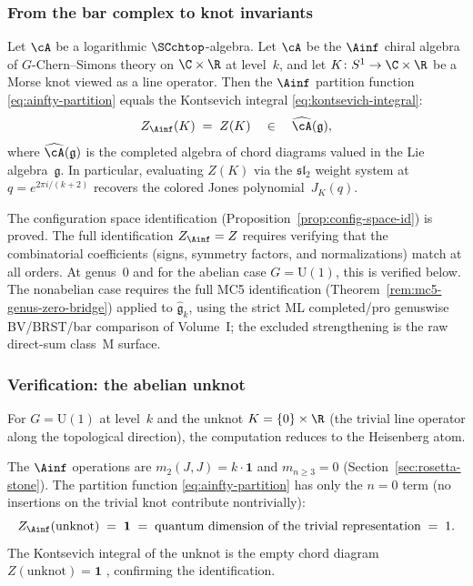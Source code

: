 \subsubsection{From the bar complex to knot invariants}

\begin{conjecture}
\label{conj:bar-kontsevich}
Let\/ $\cA$ be a logarithmic\/ $\SCchtop$-algebra. Let $\cA$ be the $\Ainf$ chiral
algebra of $G$-Chern--Simons theory on $\C \times \R$ at
level~$k$, and let $K \colon S^1 \to \C \times \R$ be a Morse
knot viewed as a line operator. Then the $\Ainf$ partition
function \eqref{eq:ainfty-partition} equals the Kontsevich
integral \eqref{eq:kontsevich-integral}:
\[
Z_{\Ainf}(K) \;=\; Z(K)
\quad \in \quad \widehat{\cA}(\mathfrak{g}),
\]
where $\widehat{\cA}(\mathfrak{g})$ is the completed algebra of
chord diagrams valued in the Lie algebra~$\mathfrak{g}$.
In particular, evaluating $Z(K)$ via the $\mathfrak{sl}_2$
weight system at $q = e^{2\pi i/(k+2)}$ recovers the colored
Jones polynomial~$J_K(q)$.
\end{conjecture}

\begin{remark}
\label{rem:bar-kontsevich-status}
The configuration space identification
(Proposition~\ref{prop:config-space-id}) is proved. The full
identification $Z_{\Ainf} = Z$ requires verifying that the
combinatorial coefficients (signs, symmetry factors, and
normalizations) match at all orders. At genus~$0$ and for the
abelian case $G = \mathrm{U}(1)$, this is verified below. The
nonabelian case requires the full MC5 identification
(Theorem~\ref{rem:mc5-genus-zero-bridge}) applied to
$\widehat{\mathfrak{g}}_k$, using the strict ML completed/pro
genuswise BV/BRST/bar comparison of Volume~I; the excluded
strengthening is the raw direct-sum class~M surface.
\end{remark}

\subsubsection{Verification: the abelian unknot}

For $G = \mathrm{U}(1)$ at level~$k$ and the unknot
$K = \{0\} \times \R$ (the trivial line operator along the
topological direction), the computation reduces to the Heisenberg
atom.

The $\Ainf$ operations are $m_2(J, J) = k \cdot \mathbf{1}$ and
$m_{n \geq 3} = 0$ (Section~\ref{sec:rosetta-stone}). The
partition function \eqref{eq:ainfty-partition} has only the
$n = 0$ term (no insertions on the trivial knot contribute
nontrivially):
\[
Z_{\Ainf}(\text{unknot}) \;=\; \mathbf{1}
\;=\; \text{quantum dimension of the trivial representation}
\;=\; 1.
\]
The Kontsevich integral of the unknot is the empty chord diagram
$Z(\text{unknot}) = \mathbf{1}$ \cite{Kon94}, confirming the
identification.

